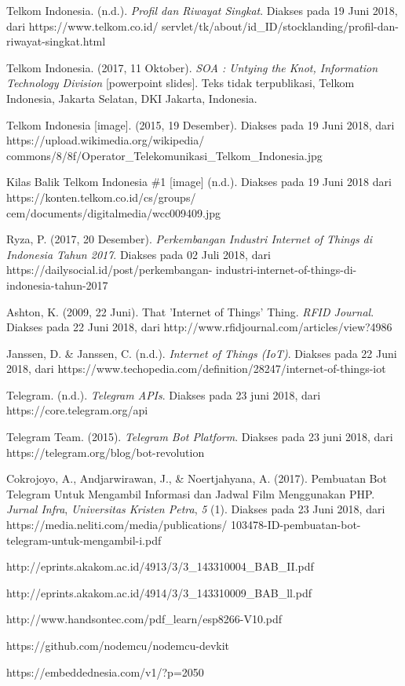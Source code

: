 \begin{thebibliography}{9}
	
	Telkom Indonesia. (n.d.). \textit{Profil dan Riwayat Singkat}. Diakses pada 19 Juni 2018, dari  https://www.telkom.co.id/ servlet/tk/about/id\_ID/stocklanding/profil-dan-riwayat-singkat.html
	
	Telkom Indonesia. (2017, 11 Oktober). \textit{SOA : Untying the Knot, Information Technology Division} [powerpoint slides]. Teks tidak terpublikasi, Telkom Indonesia, Jakarta Selatan, DKI Jakarta, Indonesia. 
	

	Telkom Indonesia [image]. (2015, 19 Desember). Diakses pada 19 Juni 2018, dari https://upload.wikimedia.org/wikipedia/ commons/8/8f/Operator\_Telekomunikasi\_Telkom\_Indonesia.jpg
	

	Kilas Balik Telkom Indonesia \#1 [image] (n.d.). Diakses pada 19 Juni 2018 dari https://konten.telkom.co.id/cs/groups/ cem/documents/digitalmedia/wcc009409.jpg
	
	Ryza, P. (2017, 20 Desember). 
	\textit{Perkembangan Industri Internet of Things di Indonesia Tahun 2017}. Diakses pada 02 Juli 2018, dari https://dailysocial.id/post/perkembangan- industri-internet-of-things-di-indonesia-tahun-2017

	Ashton, K. (2009, 22 Juni). That 'Internet of Things' Thing. \textit{RFID Journal}. Diakses pada 22 Juni 2018, dari http://www.rfidjournal.com/articles/view?4986
	
	Janssen, D. \& Janssen, C. (n.d.). \textit{Internet of Things (IoT)}. Diakses pada 22 Juni 2018, dari https://www.techopedia.com/definition/28247/internet-of-things-iot
	

	Telegram. (n.d.). \textit{Telegram APIs}. Diakses pada 23 juni 2018, dari https://core.telegram.org/api
	

	Telegram Team. (2015). \textit{Telegram Bot Platform}. Diakses pada 23 juni 2018, dari https://telegram.org/blog/bot-revolution
	

	Cokrojoyo, A., Andjarwirawan, J., \&  Noertjahyana, A. (2017). Pembuatan Bot Telegram Untuk Mengambil Informasi dan Jadwal Film Menggunakan PHP. \textit{Jurnal Infra}, \textit{Universitas Kristen Petra}, \textit{5} (1). Diakses pada 23 Juni 2018, dari https://media.neliti.com/media/publications/ 103478-ID-pembuatan-bot-telegram-untuk-mengambil-i.pdf
	
	http://eprints.akakom.ac.id/4913/3/3\_143310004\_BAB\_II.pdf
	
	http://eprints.akakom.ac.id/4914/3/3\_143310009\_BAB\_ll.pdf 
	
	http://www.handsontec.com/pdf\_learn/esp8266-V10.pdf
	
	https://github.com/nodemcu/nodemcu-devkit
	
	https://embeddednesia.com/v1/?p=2050
\end{thebibliography}
